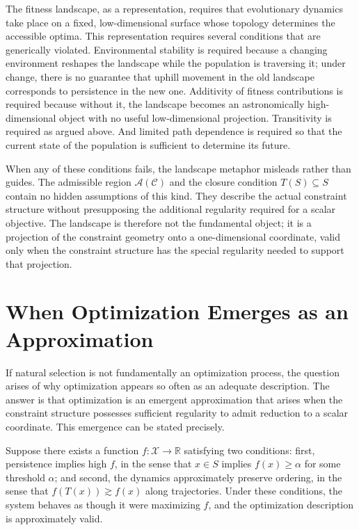 \documentclass[12pt, a4paper, oneside]{article}
\theoremstyle{plain}
\theoremstyle{definition}
\theoremstyle{remark}
\newcommand{\X}{\mathcal{X}}
\newcommand{\C}{\mathcal{C}}
\newcommand{\A}{\mathcal{A}}
\newcommand{\T}{T}
\begin{document}
The fitness landscape, as a representation, requires that evolutionary dynamics take place on a fixed, low-dimensional surface whose topology determines the accessible optima. This representation requires several conditions that are generically violated. Environmental stability is required because a changing environment reshapes the landscape while the population is traversing it; under change, there is no guarantee that uphill movement in the old landscape corresponds to persistence in the new one. Additivity of fitness contributions is required because without it, the landscape becomes an astronomically high-dimensional object with no useful low-dimensional projection. Transitivity is required as argued above. And limited path dependence is required so that the current state of the population is sufficient to determine its future.

When any of these conditions fails, the landscape metaphor misleads rather than guides. The admissible region $\A(\C)$ and the closure condition $\T(S) \subseteq S$ contain no hidden assumptions of this kind. They describe the actual constraint structure without presupposing the additional regularity required for a scalar objective. The landscape is therefore not the fundamental object; it is a projection of the constraint geometry onto a one-dimensional coordinate, valid only when the constraint structure has the special regularity needed to support that projection.

\section{When Optimization Emerges as an Approximation}

If natural selection is not fundamentally an optimization process, the question arises of why optimization appears so often as an adequate description. The answer is that optimization is an emergent approximation that arises when the constraint structure possesses sufficient regularity to admit reduction to a scalar coordinate. This emergence can be stated precisely.

Suppose there exists a function $f : \X \to \mathbb{R}$ satisfying two conditions: first, persistence implies high $f$, in the sense that $x \in S$ implies $f(x) \geq \alpha$ for some threshold $\alpha$; and second, the dynamics approximately preserve ordering, in the sense that $f(\T(x)) \gtrsim f(x)$ along trajectories. Under these conditions, the system behaves as though it were maximizing $f$, and the optimization description is approximately valid.
\end{document}
